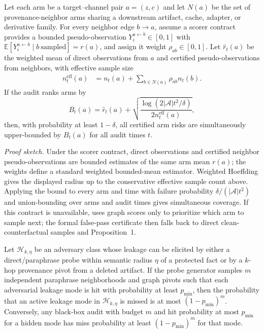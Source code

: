 \begin{proposition}
Let each arm be a target--channel pair $a=(z,c)$ and let $N(a)$ be the set of provenance-neighbor arms sharing a downstream artifact, cache, adapter, or derivative family. For every neighbor edge $b\to a$, assume a scorer contract provides a bounded pseudo-observation $Y_i^{a\leftarrow b}\in[0,1]$ with $\mathbb{E}[Y_i^{a\leftarrow b}\mid b\ \mathrm{sampled}]=r(a)$, and assign it weight $\rho_{ab}\in[0,1]$. Let $\hat r_t(a)$ be the weighted mean of direct observations from $a$ and certified pseudo-observations from neighbors, with effective sample size
\begin{align}
n_t^{\mathrm{eff}}(a)&=n_t(a)+
\sum_{b\in N(a)}\rho_{ab}n_t(b). \nonumber
\end{align}
If the audit ranks arms by
\[
B_t(a)=\hat r_t(a)+
\sqrt{\frac{\log(2|\mathcal{A}|t^2/\delta)}
{2 n_t^{\mathrm{eff}}(a)}} ,
\]
then, with probability at least $1-\delta$, all certified arm risks are simultaneously upper-bounded by $B_t(a)$ for all audit times $t$.
\end{proposition}

\textit{Proof sketch.}
Under the scorer contract, direct observations and certified neighbor pseudo-observations are bounded estimates of the same arm mean $r(a)$; the weights define a standard weighted bounded-mean estimator. Weighted Hoeffding gives the displayed radius up to the conservative effective sample count above. Applying the bound to every arm and time with failure probability $\delta/(|\mathcal{A}|t^2)$ and union-bounding over arms and audit times gives simultaneous coverage. If this contract is unavailable, \method{} uses graph scores only to prioritize which arm to sample next; the formal false-pass certificate then falls back to direct clean-counterfactual samples and Proposition~1.

\begin{proposition}
Let $\mathcal{H}_{k,\eta}$ be an adversary class whose leakage can be elicited by either a direct/paraphrase probe within semantic radius $\eta$ of a protected fact or by a $k$-hop provenance pivot from a deleted artifact. If the probe generator samples $m$ independent paraphrase neighborhoods and graph pivots such that each adversarial leakage mode is hit with probability at least $p_{\min}$, then the probability that an active leakage mode in $\mathcal{H}_{k,\eta}$ is missed is at most $(1-p_{\min})^m$. Conversely, any black-box audit with budget $m$ and hit probability at most $p_{\min}$ for a hidden mode has miss probability at least $(1-p_{\min})^m$ for that mode.
\end{proposition}

